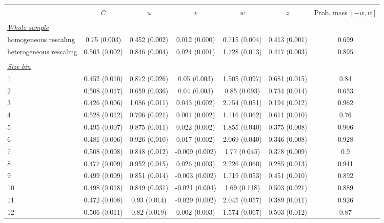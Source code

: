 
\begin{tabular}{@{\extracolsep{5pt}} l cccccc} 
\\[-1.8ex]\hline 
\hline \\[-1.8ex] 
 & $C$ & $u$ & $v$ & $w$ & $z$ & Prob. mass $[-w,w]$ \\ 
\hline \\[-1.8ex] 
\underline{{\it Whole sample}} &   &   &   &   &   &  \\ 
homogeneous rescaling & 0.75 (0.003) & 0.452 (0.002) & 0.012 (0.000) & 0.715 (0.004) & 0.413 (0.001) & 0.699 \\ 
heterogeneous rescaling & 0.503 (0.002) & 0.846 (0.004) & 0.024 (0.001) & 1.728 (0.013) & 0.417 (0.003) & 0.895 \\ 
 &   &   &   &   &   &  \\ 
\underline{{\it Size bin}} &   &   &   &   &   &  \\ 
1 & 0.452 (0.010) & 0.872 (0.026) & 0.05 (0.003) & 1.505 (0.097) & 0.681 (0.015) & 0.84 \\ 
2 & 0.508 (0.017) & 0.659 (0.036) & 0.04 (0.003) & 0.85 (0.093) & 0.734 (0.014) & 0.653 \\ 
3 & 0.426 (0.006) & 1.086 (0.011) & 0.043 (0.002) & 2.754 (0.051) & 0.194 (0.012) & 0.962 \\ 
4 & 0.528 (0.012) & 0.706 (0.021) & 0.001 (0.002) & 1.116 (0.062) & 0.611 (0.010) & 0.76 \\ 
5 & 0.495 (0.007) & 0.875 (0.011) & 0.022 (0.002) & 1.855 (0.040) & 0.375 (0.008) & 0.906 \\ 
6 & 0.481 (0.006) & 0.926 (0.010) & 0.017 (0.002) & 2.069 (0.040) & 0.346 (0.008) & 0.928 \\ 
7 & 0.508 (0.008) & 0.848 (0.012) & -0.009 (0.002) & 1.77 (0.045) & 0.378 (0.009) & 0.9 \\ 
8 & 0.477 (0.009) & 0.952 (0.015) & 0.026 (0.003) & 2.226 (0.060) & 0.285 (0.013) & 0.941 \\ 
9 & 0.499 (0.009) & 0.851 (0.014) & -0.003 (0.002) & 1.719 (0.053) & 0.451 (0.010) & 0.892 \\ 
10 & 0.498 (0.018) & 0.849 (0.031) & -0.021 (0.004) & 1.69 (0.118) & 0.503 (0.021) & 0.889 \\ 
11 & 0.472 (0.008) & 0.93 (0.014) & -0.029 (0.002) & 2.045 (0.057) & 0.389 (0.011) & 0.926 \\ 
12 & 0.506 (0.011) & 0.82 (0.019) & 0.002 (0.003) & 1.574 (0.067) & 0.503 (0.012) & 0.87 \\ 

\end{tabular}

